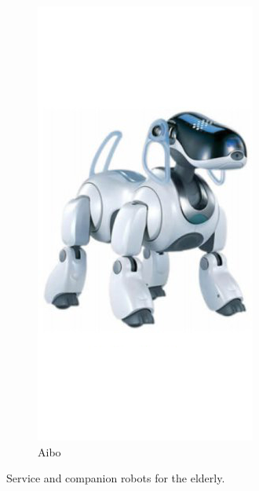 \begin{figure}[h]
\begin{subfigure}[h]{0.2\textwidth}
                \includegraphics[width=\textwidth]{./img/3/aibo}
                \caption{Aibo}
                \label{fig:aibo}
        \end{subfigure}
        \caption{Service and companion robots for the elderly.}\label{fig:elder-robots}
\end{figure}

